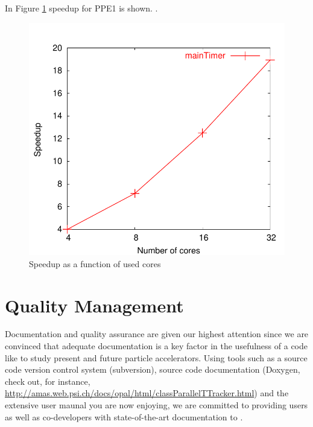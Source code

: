 In Figure \ref{fig:speedupdrift} speedup for PPE1 is shown. \latermore .

\begin{figure}[ht]
 \begin{center}
  \includegraphics[width=0.6\linewidth,angle=0]{figures/speedup/Drift/mainTimer-speedup}
  \caption{Speedup as a function of used cores}
   \label{fig:speedupdrift}
 \end{center}
\end{figure}

\section{Quality Management}
Documentation and quality assurance are given our highest attention since we are convinced that adequate documentation 
is a key factor in the usefulness of a code like \opal to study present and future particle accelerators. 
 Using tools such as a source code version
control system (subversion), source code documentation (Doxygen, check out, for instance,  \url{http://amas.web.psi.ch/docs/opal/html/classParallelTTracker.html}) and the extensive user maunal
you are now enjoying, we are committed to providing users as well as co-developers with 
state-of-the-art documentation to \opal.

